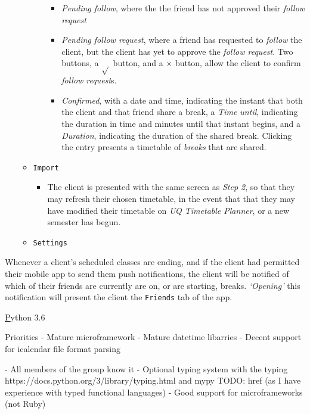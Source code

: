 \documentclass[11pt,a4paper]{report}
\begin{document}
\begin{itemize}
\begin{itemize}
\begin{itemize}
\begin{itemize}
                            \item \textit{Pending follow}, where the the friend has not approved their \textit{follow request}
                            \item \textit{Pending follow request}, where a friend has requested to \textit{follow} the client, but the client has yet to approve the \textit{follow request}. Two buttons, a $\sqrt{}$ button, and a $\times$ button, allow the client to confirm \textit{follow request}s.
                            \item \textit{Confirmed}, with a date and time, indicating the instant that both the client and that friend share a break, a \textit{Time until}, indicating the duration in time and minutes until that instant begins, and a \textit{Duration}, indicating the duration of the shared break. Clicking the entry presents a timetable of \textit{breaks} that are shared.
                        \end{itemize}
                \end{itemize}
            \item \texttt{Import}
                \begin{itemize}
                    \item The client is presented with the same screen as \textit{Step 2}, so that they may refresh their chosen timetable, in the event that that they may have modified their timetable on \textit{UQ Timetable Planner}, or a new semester has begun.
                \end{itemize}
            \item \texttt{Settings}
        \end{itemize}
\end{itemize}

Whenever a client's scheduled classes are ending, and if the client had permitted their mobile app to send them push notifications, the client will be notified of which of their friends are currently are on, or are starting, breaks. \textit{`Opening'} this notification will present the client the \texttt{Friends} tab of the app.

\href{https://www.python.org/}Python 3.6


Priorities
- Mature microframework
- Mature datetime libarries
- Decent support for icalendar file format parsing


- All members of the group know it
- Optional typing system with the typing https://docs.python.org/3/library/typing.html and mypy TODO: href (as I have experience with typed functional languages)
- Good support for microframeworks (not Ruby)
\end{document}
